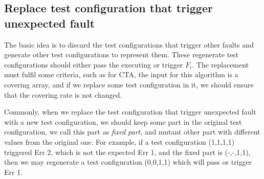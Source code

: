 \documentclass{sig-alternate}
\begin{document}

%
%
%
%

\subsection{Replace test configuration that trigger unexpected fault}

The basic idea is to discard the test configurations that trigger other faults and generate other test configurations to represent them. These regenerate test configurations should either pass the executing or trigger $F_{i}$.  The replacement must fulfil some criteria, such as for CTA, the input for this algorithm is a covering array, and if we replace some test configuration in it, we should ensure that the covering rate is not changed.

Commonly, when we replace the test configuration that trigger unexpected fault with a new test configuration, we should keep some part in the original test configuration, we call this part as \emph{fixed part}, and mutant other part with different values from the original one. For example, if a test configuration (1,1,1,1) triggered Err 2, which is not the expected Err 1, and the fixed part is (-,-,1,1), then we may regenerate a test configuration (0,0,1,1) which will pass or trigger Err 1.
\end{document}
